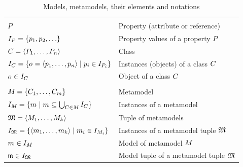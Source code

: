 \begin{table}
    \centering
    \small
    \renewcommand{\arraystretch}{1.4}%
    \begin{tabular}{R{4.8cm} L{5cm}}
        \toprule
        \rowcolor{\headinglinecolor}
        \\
        $P$
            & Property (attribute or reference) \\
        $\instances{P} = \setted{p_1, p_2, \dots}$     
            & Property values of a property $P$ \\
        $C_{} = \langle P_1, \dots, P_n \rangle$
            & Class \\
        $I_{C_{}} = \{ o_{} = \langle p_1, \dots, p_n \rangle \mid p_i \in I_{P_i} \}$ 
            & Instances (objects) of a class $C_{}$\\
        $o_{} \in I_{C_{}}$
            & Object of a class $C_{}$ \\
        \midrule
        \rowcolor{\headinglinecolor}
        \\
        $M_{} = \{ C_{1}, \dots, C_{m} \}$
            & Metamodel\\
        $I_{M_{}} = \{ m_{} \mid m_{} \subseteq \bigcup_{C_{} \in M_{}} I_{C_{}} \}$
            & Instances of a metamodel\\
        $\mathfrak{M} = \langle M_{1}, \dots, M_{k} \rangle$
            & Tuple of metamodels\\
        $I_{\mathfrak{M}} = \{  \langle m_{1}, \dots, m_{k} \rangle \mid m_{i} \in I_{M_{i}} \}$
            & Instances of a metamodel tuple $\mathfrak{M}$\\
        $m_{} \in I_{M_{}}$
            & Model of metamodel $M_{}$\\
        $\mathfrak{m} \in I_{\mathfrak{M}}$
            & Model tuple of a metamodel tuple $\mathfrak{M}$\\
        \bottomrule
    \end{tabular}
    \caption[Models, metamodels, their elements and notations]{Models, metamodels, their elements and notations}
    \label{tab:networks:elements}
\end{table}

